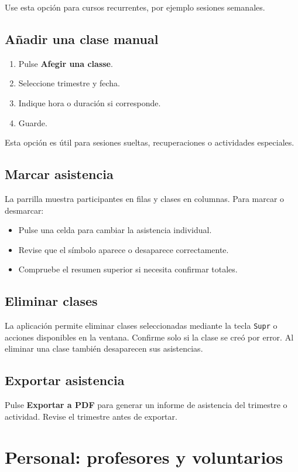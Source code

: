 \documentclass[12pt]{article}
\newcommand{\boton}[1]{\textbf{#1}}
\begin{document}
Use esta opción para cursos recurrentes, por ejemplo sesiones semanales.

\subsection{Añadir una clase manual}
\begin{enumerate}
  \item Pulse \boton{Afegir una classe}.
  \item Seleccione trimestre y fecha.
  \item Indique hora o duración si corresponde.
  \item Guarde.
\end{enumerate}

Esta opción es útil para sesiones sueltas, recuperaciones o actividades especiales.

\subsection{Marcar asistencia}
La parrilla muestra participantes en filas y clases en columnas. Para marcar o desmarcar:
\begin{itemize}
  \item Pulse una celda para cambiar la asistencia individual.
  \item Revise que el símbolo aparece o desaparece correctamente.
  \item Compruebe el resumen superior si necesita confirmar totales.
\end{itemize}

\subsection{Eliminar clases}
La aplicación permite eliminar clases seleccionadas mediante la tecla \texttt{Supr} o acciones disponibles en la ventana. Confirme solo si la clase se creó por error. Al eliminar una clase también desaparecen sus asistencias.

\subsection{Exportar asistencia}
Pulse \boton{Exportar a PDF} para generar un informe de asistencia del trimestre o actividad. Revise el trimestre antes de exportar.

\section{Personal: profesores y voluntarios}
\end{document}
